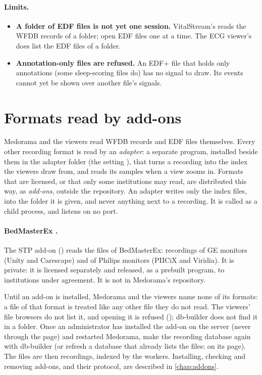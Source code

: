 \paragraph{Limits.}
\begin{itemize}
\item \textbf{A folder of EDF files is not yet one session.} VitalStream's  reads the WFDB records of a folder; open EDF files one at a time. The ECG viewer's
   does list the EDF files of a folder.
\item \textbf{Annotation-only files are refused.} An EDF+ file that holds only annotations (some
  sleep-scoring files do) has no signal to draw. Its events cannot yet be shown over another
  file's signals.
\end{itemize}

\section{Formats read by add-ons}
\label{sec:recordings-addons}

Medorama and the viewers read WFDB records and EDF files themselves. Every other recording
format is read by an \emph{adapter}: a separate program, installed beside them in the adapter
folder (the setting ), that turns a recording into the index the viewers draw
from, and reads its samples when a view zooms in. Formats that are licensed, or that only some
institutions may read, are distributed this way, as \emph{add-ons}, outside the repository. An
adapter writes only the index files, into the folder it is given, and never anything next to a
recording. It is called as a child process, and listens on no port.

\paragraph{BedMasterEx .} The STP add-on () reads the 
files of BedMasterEx: recordings of GE monitors (Unity and Carescape) and of Philips monitors
(PIICiX and Viridia). It is private: it is licensed separately and released, as a prebuilt
program, to institutions under agreement. It is not in Medorama's repository.

Until an add-on is installed, Medorama and the viewers name none of its formats: a file of that
format is treated like any other file they do not read. The viewers' file browsers do not list
it, and opening it is refused (); db-builder does not
find it in a folder. Once an administrator has installed the add-on on the server (never through
the page) and restarted Medorama, make the recording database again with db-builder (or refresh a
database that already lists the files:  on its page). The files are then recordings,
indexed by the workers. Installing, checking and removing add-ons, and their protocol, are
described in \cref{chap:addons}.

